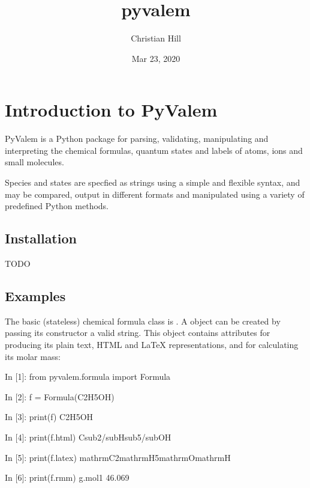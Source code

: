 \documentclass[letterpaper,10pt,english]{sphinxmanual}
\title{pyvalem}
\date{Mar 23, 2020}
\author{Christian Hill}
\begin{document}
\pagestyle{empty}
\sphinxmaketitle
\pagestyle{plain}
\sphinxtableofcontents
\pagestyle{normal}
\label{\detokenize{index::doc}}



\chapter{Introduction to PyValem}
\label{\detokenize{introduction:introduction-to-pyvalem}}\label{\detokenize{introduction::doc}}
PyValem is a Python package for parsing, validating, manipulating and
interpreting the chemical formulas, quantum states and labels of atoms, ions
and small molecules.

Species and states are specfied as strings using a simple and flexible syntax,
and may be compared, output in different formats and manipulated using a
variety of predefined Python methods.


\section{Installation}
\label{\detokenize{introduction:installation}}
TODO


\section{Examples}
\label{\detokenize{introduction:examples}}
The basic (state\sphinxhyphen{}less) chemical formula class is . A  object
can be created by passing its constructor a valid string. This object contains
attributes for producing its plain text, HTML and LaTeX representations, and
for calculating its molar mass:

\begin{sphinxVerbatim}[commandchars=\\\{\}]
In [1]: from pyvalem.formula import Formula

In [2]: f = Formula(\PYGZsq{}C2H5OH\PYGZsq{})

In [3]: print(f)
C2H5OH

In [4]: print(f.html)
C\PYGZlt{}sub\PYGZgt{}2\PYGZlt{}/sub\PYGZgt{}H\PYGZlt{}sub\PYGZgt{}5\PYGZlt{}/sub\PYGZgt{}OH

In [5]: print(f.latex)
\PYGZdl{}\PYGZbs{}mathrm\PYGZob{}C\PYGZcb{}\PYGZus{}\PYGZob{}2\PYGZcb{}\PYGZbs{}mathrm\PYGZob{}H\PYGZcb{}\PYGZus{}\PYGZob{}5\PYGZcb{}\PYGZbs{}mathrm\PYGZob{}O\PYGZcb{}\PYGZbs{}mathrm\PYGZob{}H\PYGZcb{}\PYGZdl{}

In [6]: print(f.rmm)    \PYGZsh{} g.mol\PYGZhy{}1
46.069
\end{sphinxVerbatim}
\end{document}
